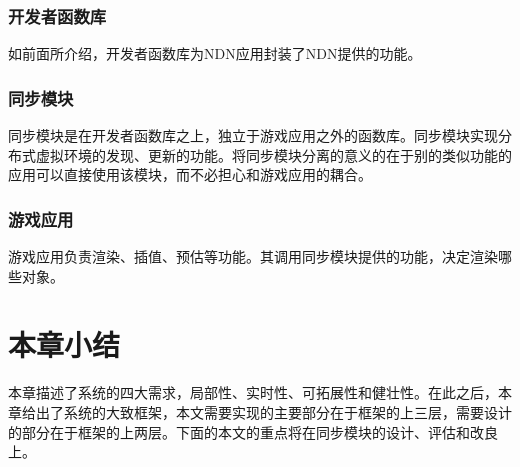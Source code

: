 \subsubsection{开发者函数库}
\par
如前面所介绍，开发者函数库为NDN应用封装了NDN提供的功能。
\subsubsection{同步模块}
\par
同步模块是在开发者函数库之上，独立于游戏应用之外的函数库。同步模块实现分布式虚拟环境的发现、更新的功能。将同步模块分离的意义的在于别的类似功能的应用可以直接使用该模块，而不必担心和游戏应用的耦合。
\subsubsection{游戏应用}
\par
游戏应用负责渲染、插值、预估等功能。其调用同步模块提供的功能，决定渲染哪些对象。
\section{本章小结}
本章描述了系统的四大需求，局部性、实时性、可拓展性和健壮性。在此之后，本章给出了系统的大致框架，本文需要实现的主要部分在于框架的上三层，需要设计的部分在于框架的上两层。下面的本文的重点将在同步模块的设计、评估和改良上。

